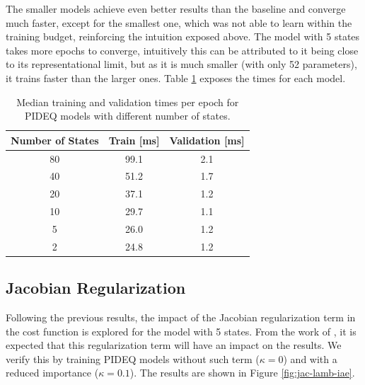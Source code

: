 The smaller models achieve even better results than the baseline and converge much faster, except for the smallest one, which was not able to learn within the training budget, reinforcing the intuition exposed above.
The model with 5 states takes more epochs to converge, intuitively this can be attributed to it being close to its representational limit, but as it is much smaller (with only 52 parameters), it trains faster than the larger ones.
Table \ref{tab:n-states-times} exposes the times for each model.

\begin{table}[h]
    \centering
    \caption{Median training and validation times per epoch for \gls{PIDEQ} models with different number of states.}
    \label{tab:n-states-times}
    \begin{tabular}{ccc}
	\toprule
	\textbf{Number of States} & \textbf{Train} [ms] & \textbf{Validation} [ms] \\ \midrule
	80       & 99.1       & 2.1             \\
	40       & 51.2       & 1.7             \\
	20       & 37.1       & 1.2             \\
	10       & 29.7       & 1.1             \\
	5        & 26.0       & 1.2             \\
	2        & 24.8       & 1.2             \\ \bottomrule
    \end{tabular}
\end{table}

\subsection{Jacobian Regularization}

Following the previous results, the impact of the Jacobian regularization term in the cost function is explored for the model with 5 states.
From the work of \textcite{bai_stabilizing_2021}, it is expected that this regularization term will have an impact on the results.
We verify this by training \gls{PIDEQ} models without such term ($\kappa=0$) and with a reduced importance ($\kappa=0.1$).
The results are shown in Figure \ref{fig:jac-lamb-iae}.

